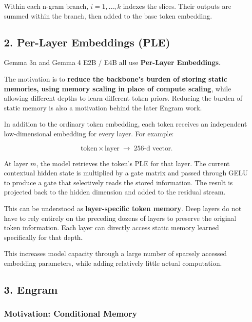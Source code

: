 \documentclass[
  11pt,
  a4paper,
]{article}
\newenvironment{NotesFormula}{%
  \par\noindent\begin{minipage}{\linewidth}%
  \setlength{\parindent}{2em}%
  \setlength{\parskip}{0.35em}%
}{\end{minipage}\par}
\begin{document}
Within each n-gram branch, \(i=1,\ldots,k\) indexes the slices. Their
outputs are summed within the branch, then added to the base token
embedding.

\clearpage

\subsection{2. Per-Layer Embeddings
(PLE)}\label{per-layer-embeddings-ple}

Gemma 3n and Gemma 4 E2B / E4B all use \textbf{Per-Layer Embeddings}.

The motivation is to \textbf{reduce the backbone's burden of storing
static memories, using memory scaling in place of compute scaling},
while allowing different depths to learn different token priors.
Reducing the burden of static memory is also a motivation behind the
later Engram work.

\begin{NotesFormula}

In addition to the ordinary token embedding, each token receives an
independent low-dimensional embedding for every layer. For example:

\[
\text{token}\times\text{layer}\;\longrightarrow\;\text{256-d vector}.
\]

\end{NotesFormula}

At layer \(m\), the model retrieves the token's PLE for that layer. The
current contextual hidden state is multiplied by a gate matrix and
passed through GELU to produce a gate that selectively reads the stored
information. The result is projected back to the hidden dimension and
added to the residual stream.

This can be understood as \textbf{layer-specific token memory}. Deep
layers do not have to rely entirely on the preceding dozens of layers to
preserve the original token information. Each layer can directly access
static memory learned specifically for that depth.

This increases model capacity through a large number of sparsely
accessed embedding parameters, while adding relatively little actual
computation.

\subsection{3. Engram}\label{engram}

\subsubsection{Motivation: Conditional
Memory}\label{motivation-conditional-memory}
\end{document}
